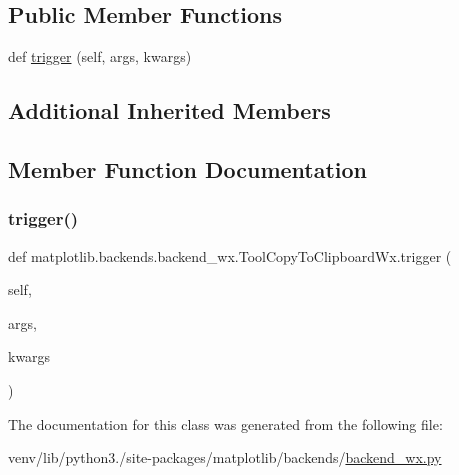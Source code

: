 \subsection*{Public Member Functions}
\begin{DoxyCompactItemize}
\item 
def \hyperlink{classmatplotlib_1_1backends_1_1backend__wx_1_1ToolCopyToClipboardWx_a5620807c9b83bf69e46bc3e1e9f05e4f}{trigger} (self, args, kwargs)
\end{DoxyCompactItemize}
\subsection*{Additional Inherited Members}


\subsection{Member Function Documentation}
\mbox{\label{classmatplotlib_1_1backends_1_1backend__wx_1_1ToolCopyToClipboardWx_a5620807c9b83bf69e46bc3e1e9f05e4f}} 
\subsubsection{\texorpdfstring{trigger()}{trigger()}}
{\footnotesize\ttfamily def matplotlib.\+backends.\+backend\+\_\+wx.\+Tool\+Copy\+To\+Clipboard\+Wx.\+trigger (\begin{DoxyParamCaption}\item[{}]{self,  }\item[{}]{args,  }\item[{}]{kwargs }\end{DoxyParamCaption})}



The documentation for this class was generated from the following file\+:\begin{DoxyCompactItemize}
\item 
venv/lib/python3./site-\/packages/matplotlib/backends/\hyperlink{backend__wx_8py}{backend\+\_\+wx.\+py}\end{DoxyCompactItemize}
